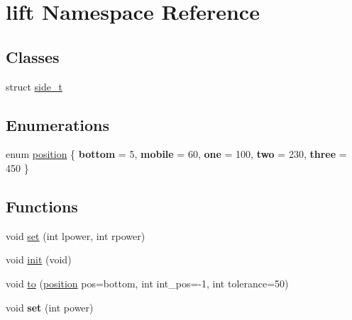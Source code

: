 \hypertarget{namespacelift}{}\section{lift Namespace Reference}
\label{namespacelift}
\subsection*{Classes}
\begin{DoxyCompactItemize}
\item 
struct \hyperlink{structlift_1_1side__t}{side\+\_\+t}
\end{DoxyCompactItemize}
\subsection*{Enumerations}
\begin{DoxyCompactItemize}
\item 
enum \hyperlink{namespacelift_a4a1c349e765b3b8489da50822876099d}{position} \{ \newline
{\bfseries bottom} = 5, 
{\bfseries mobile} = 60, 
{\bfseries one} = 100, 
{\bfseries two} = 230, 
\newline
{\bfseries three} = 450
 \}
\end{DoxyCompactItemize}
\subsection*{Functions}
\begin{DoxyCompactItemize}
\item 
void \hyperlink{namespacelift_ac4499bdf3cd48c060118c4cbea45ff1c}{set} (int lpower, int rpower)
\item 
void \hyperlink{namespacelift_af207a144f6c87583f4abbb9cb3f9838f}{init} (void)
\item 
void \hyperlink{namespacelift_adf7c70b4641f006e65b0212780ba0ae8}{to} (\hyperlink{namespacelift_a4a1c349e765b3b8489da50822876099d}{position} pos=bottom, int int\+\_\+pos=-\/1, int tolerance=50)
\item 
\mbox{\label{namespacelift_a23a3c797260ed5501dc1fa0b1958bb37}} 
void {\bfseries set} (int power)
\end{DoxyCompactItemize}

